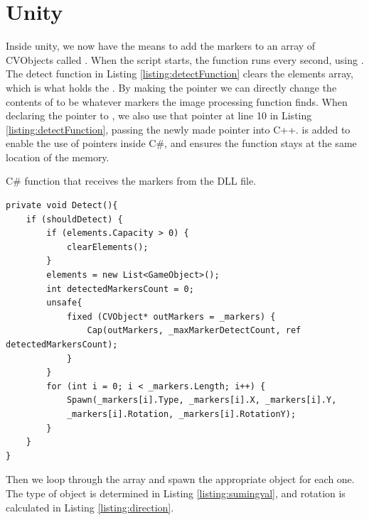 \section{Unity}
 Inside unity, we now have the means to add the markers to an array of CVObjects called . When the script starts, the  function runs every second, using . The detect function in Listing \ref{listing:detectFunction} clears the elements array, which is what holds the . By making the pointer  we can directly change the contents of  to be whatever markers the image processing function finds. When declaring the pointer to , we also use that pointer at line 10 in Listing \ref{listing:detectFunction}, passing the newly made pointer into C++.  is added to enable the use of pointers inside C\#, and  ensures the function stays at the same location of the memory.
	\begin{listing}[H]
		\caption{C\# function that receives the markers from the DLL file.}
		\begin{verbatim}
private void Detect(){
	if (shouldDetect) {
		if (elements.Capacity > 0) {
			clearElements();
		}
		elements = new List<GameObject>();
		int detectedMarkersCount = 0;
		unsafe{
			fixed (CVObject* outMarkers = _markers) {
				Cap(outMarkers, _maxMarkerDetectCount, ref detectedMarkersCount);
			}
		}
		for (int i = 0; i < _markers.Length; i++) {
			Spawn(_markers[i].Type, _markers[i].X, _markers[i].Y,
			_markers[i].Rotation, _markers[i].RotationY);
		}
	}
}
	\end{verbatim}
\label{listing:detectFunction}
\end{listing}
Then we loop through the  array and spawn the appropriate object for each one. The type of object is determined in Listing \ref{listing:sumingval}, and rotation is calculated in Listing \ref{listing:direction}.\\

